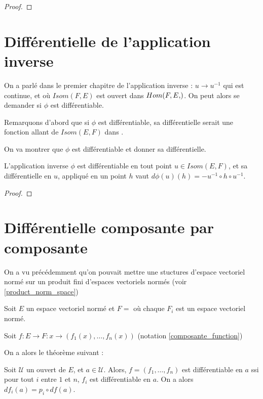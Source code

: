 \begin{proof}
	
\end{proof}

\section{Différentielle de l'application inverse}

On a parlé dans le premier chapitre de l'application inverse
 : $u \rightarrow
u^{-1}$ qui est continue, et où $Isom(F, E)$ est ouvert dans
$\GShomomorphisme{F, E}$.
On peut alors se demander si $\phi$ est différentiable.

Remarquons d'abord que si $\phi$ est différentiable, sa différentielle serait
une fonction allant de $Isom(E, F)$ dans .

On va montrer que $\phi$ est différentiable et donner sa différentielle.

\begin{theorem}
	L'application inverse $\phi$ est différentiable en tout point $u \in Isom(E,
	F)$, et sa différentielle en $u$, appliqué en un point $h$ vaut $d\phi(u)(h)
	= -u^{-1} \circ h \circ u^{-1}$.  \label{differential_inverse_application}
\end{theorem}

\begin{proof}
	
\end{proof}


\section{Différentielle composante par composante}
\label{section_differential_composante}

On a vu précédemment qu'on pouvait mettre une stuctures d'espace vectoriel
normé sur un produit fini d'espaces vectoriels normés (voir
\ref{product_norm_space})

Soit $E$ un espace vectoriel normé et $F = $  où chaque 
$F_{i}$ est un espace vectoriel normé.

Soit $f : E \rightarrow F : x \rightarrow (f_{1}(x), \ldots, f_{n}(x))$
(notation \ref{composante_function})

On a alors le théorème suivant :

\begin{theorem}
	Soit $\mathcal{U}$ un ouvert de $E$, et $a \in \mathcal{U}$. Alors, 
	$f = (f_{1}, \ldots, f_{n})$ est différentiable en $a$ ssi pour tout $i$
	entre $1$ et $n$, $f_{i}$ est différentiable en $a$. On a alors $df_{i}(a) =
	p_{i} \circ df(a)$.
	\label{differential_composante}
\end{theorem}


